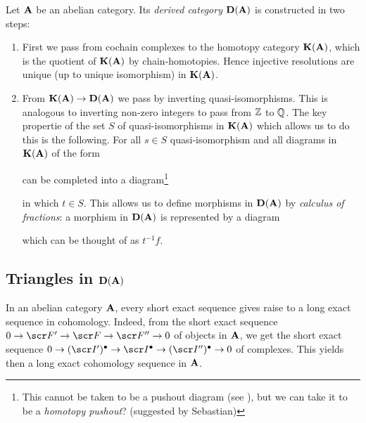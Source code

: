 \documentclass[A4paper, british, reqno]{amsart}
\theoremstyle{darkgreentheorem}
\theoremstyle{darkbluedefinition}
\theoremstyle{darkredexample}
\theoremstyle{remark}
\newcommand{\1}{\mathbbm{1}}
\newcommand{\grd}{^{\bullet}}
\begin{document}
Let $\mathbf{A}$ be an abelian category.
Its \textit{derived category} $\mathbf{D}(\mathbf{A})$ is constructed in two steps:
\begin{enumerate}
    \item First we pass from cochain complexes to the homotopy category $\mathbf{K}(\mathbf{A})$, which is the quotient of $\mathbf{K}(\mathbf{A})$ by chain-homotopies.
	Hence injective resolutions are unique (up to unique isomorphism) in $\mathbf{K}(\mathbf{A})$.
    \item From $\mathbf{K}(\mathbf{A})\to \mathbf{D}(\mathbf{A})$ we pass by inverting quasi-isomorphisms.
	This is analogous to inverting non-zero integers to pass from $\mathbb{Z}$ to $\mathbb{Q}$.
	The key propertie of the set $S$ of quasi-isomorphisms in $\mathbf{K}(\mathbf{A})$ which allows us to do this is the following.
	For all $s\in S$ quasi-isomorphism and all diagrams in $\mathbf{K}(\mathbf{A})$ of the form
	\begin{center}
	\end{center}
	can be completed into a diagram\footnote{This cannot be taken to be a pushout diagram (see \cite[Exercise 2.19]{huy06}), but we can take it to be a \textit{homotopy pushout}? (suggested by Sebastian)}
	\begin{center}
	\end{center}
	in which $t\in S$.
	This allows us to define morphisms in $\mathbf{D}(\mathbf{A})$ by \textit{calculus of fractions}: a morphism in $\mathbf{D}(\mathbf{A})$ is represented by a diagram
	\begin{center}
	\end{center}
	which can be thought of as $t^{-1}f$.
\end{enumerate}

\subsection{Triangles in $\mathbf{D}(\mathbf{A})$}

In an abelian category $\mathbf{A}$, every short exact sequence gives raise to a long exact sequence in cohomology.
Indeed, from the short exact sequence $0\to \F'\to \F\to \F''\to 0$ of objects in $\mathbf{A}$, we get the short exact sequence $0\to (\I')\grd\to \I\grd\to (\I'')\grd\to 0$ of complexes.
This yields then a long exact cohomology sequence in $\mathbf{A}$.
\end{document}
